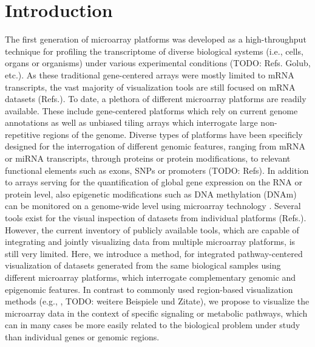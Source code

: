 \documentclass{bioinfo}
\begin{document}
\section{Introduction}

The first generation of microarray platforms was developed as a high-throughput technique for profiling the transcriptome of diverse biological systems (i.e., cells, organs or organisms) under various experimental conditions (TODO: Refs. Golub, etc.). As these traditional gene-centered arrays were mostly limited to mRNA transcripts, the vast majority of visualization tools are still focused on mRNA datasets (Refs.). To date, a plethora of different microarray platforms are readily available. These include gene-centered platforms which rely on current genome annotations as well as unbiased tiling arrays which interrogate large non-repetitive regions of the genome. Diverse types of platforms have been specificly designed for the interrogation of different genomic features, ranging from mRNA or miRNA transcripts, through  proteins or protein modifications, to relevant functional elements such as exons, SNPs or promoters (TODO: Refs). In addition to arrays serving for the quantification of global gene expression on the RNA or protein level, also epigenetic modifications such as DNA methylation (DNAm) can be monitored on a genome-wide level using microarray technology \citep{Hoheisel2006}.
Several tools exist for the visual inspection of datasets from individual platforms (Refs.). However, the current inventory of publicly available tools, which are capable of integrating and jointly visualizing data from multiple microarray platforms, is still very limited.
Here, we introduce a method, for integrated pathway-centered visualization of datasets generated from the same biological samples using different microarray platforms, which interrogate complementary genomic and epigenomic features.
In contrast to commonly used region-based visualization methods (e.g., \citep[see][]{UCSCBrowser}, TODO: weitere Beispiele und Zitate), we propose to visualize the microarray data in the context of specific signaling or metabolic pathways, which can in many cases be more easily related to the biological problem under study than individual genes or genomic regions.
\end{document}

